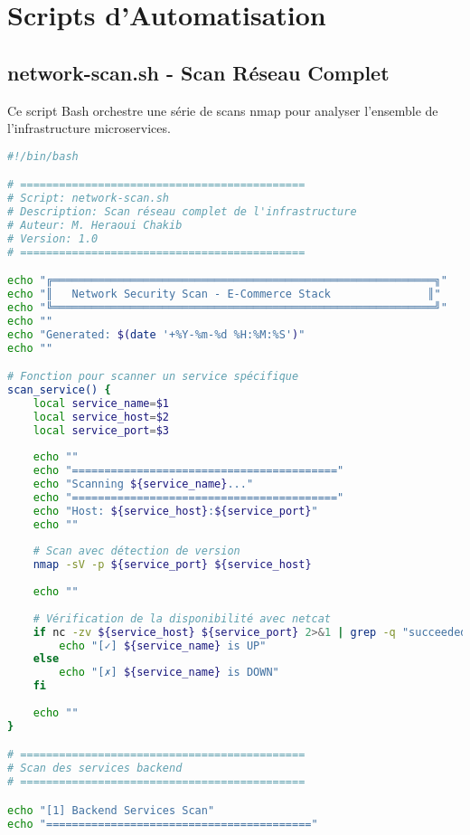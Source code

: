 \documentclass[11pt,a4paper]{report}
\begin{document}
\chapter{Scripts d'Automatisation}

\section{network-scan.sh - Scan Réseau Complet}

Ce script Bash orchestre une série de scans nmap pour analyser l'ensemble de l'infrastructure microservices.

\begin{lstlisting}[language=bash, caption=network-scan.sh - Script Complet, basicstyle=\ttfamily\tiny]
#!/bin/bash

# ============================================
# Script: network-scan.sh
# Description: Scan réseau complet de l'infrastructure
# Auteur: M. Heraoui Chakib
# Version: 1.0
# ============================================

echo "╔═══════════════════════════════════════════════════════════╗"
echo "║   Network Security Scan - E-Commerce Stack               ║"
echo "╚═══════════════════════════════════════════════════════════╝"
echo ""
echo "Generated: $(date '+%Y-%m-%d %H:%M:%S')"
echo ""

# Fonction pour scanner un service spécifique
scan_service() {
    local service_name=$1
    local service_host=$2
    local service_port=$3
    
    echo ""
    echo "========================================="
    echo "Scanning ${service_name}..."
    echo "========================================="
    echo "Host: ${service_host}:${service_port}"
    echo ""
    
    # Scan avec détection de version
    nmap -sV -p ${service_port} ${service_host}
    
    echo ""
    
    # Vérification de la disponibilité avec netcat
    if nc -zv ${service_host} ${service_port} 2>&1 | grep -q "succeeded"; then
        echo "[✓] ${service_name} is UP"
    else
        echo "[✗] ${service_name} is DOWN"
    fi
    
    echo ""
}

# ============================================
# Scan des services backend
# ============================================

echo "[1] Backend Services Scan"
echo "========================================="


\end{lstlisting}
\end{document}

